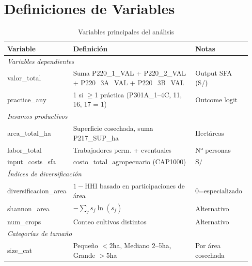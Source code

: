 \documentclass[11pt,a4paper]{article}
\newcommand{\HHI}{\text{HHI}}
\begin{document}
\section{Definiciones de Variables}

\begin{table}[H]
\centering
\caption{Variables principales del análisis}
\label{tab:variable_definitions}
\begin{threeparttable}
\small
\begin{tabular}{p{3.2cm}p{6.5cm}p{3.8cm}}
\toprule
\textbf{Variable} & \textbf{Definición} & \textbf{Notas} \\
\midrule
\multicolumn{3}{l}{\textit{Variables dependientes}} \\
valor\_total & Suma P220\_1\_VAL + P220\_2\_VAL + P220\_3A\_VAL + P220\_3B\_VAL & Output SFA (S/) \\
practice\_any & 1 si $\geq$1 práctica (P301A\_1--4C, 11, 16, 17 = 1) & Outcome logit \\
\midrule
\multicolumn{3}{l}{\textit{Insumos productivos}} \\
area\_total\_ha & Superficie cosechada, suma P217\_SUP\_ha & Hectáreas \\
labor\_total & Trabajadores perm. + eventuales & N° personas \\
input\_costs\_sfa & costo\_total\_agropecuario (CAP1000) & S/ \\
\midrule
\multicolumn{3}{l}{\textit{Índices de diversificación}} \\
diversificacion\_area & $1 - \HHI$ basado en participaciones de área & 0=especializado \\
shannon\_area & $-\sum_j s_j \ln(s_j)$ & Alternativo \\
num\_crops & Conteo cultivos distintos & Alternativo \\
\midrule
\multicolumn{3}{l}{\textit{Categorías de tamaño}} \\
size\_cat & Pequeño $<$2ha, Mediano 2--5ha, Grande $>$5ha & Por área cosechada \\
\bottomrule
\end{tabular}
\end{threeparttable}
\end{table}
\end{document}
